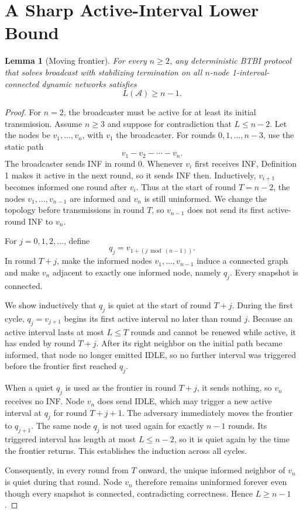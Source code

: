 \documentclass[11pt]{article}
\newtheorem{lemma}{Lemma}
\begin{document}
\section{A Sharp Active-Interval Lower Bound}
\begin{lemma}[Moving frontier]
For every $n\ge2$, any deterministic BTBI protocol that solves broadcast with stabilizing termination on all $n$-node 1-interval-connected dynamic networks satisfies
\[
L(\mathcal A)\ge n-1.
\]
\end{lemma}
\begin{proof}
For $n=2$, the broadcaster must be active for at least its initial transmission. Assume $n\ge3$ and suppose for contradiction that $L\le n-2$. Let the nodes be $v_1,\dots,v_n$, with $v_1$ the broadcaster. For rounds $0,1,\dots,n-3$, use the static path
\[
v_1-v_2-\cdots-v_n.
\]
The broadcaster sends INF in round 0. Whenever $v_i$ first receives INF, Definition 1 makes it active in the next round, so it sends INF then. Inductively, $v_{i+1}$ becomes informed one round after $v_i$. Thus at the start of round $T=n-2$, the nodes $v_1,\dots,v_{n-1}$ are informed and $v_n$ is still uninformed. We change the topology before transmissions in round $T$, so $v_{n-1}$ does not send its first active-round INF to $v_n$.

For $j=0,1,2,\dots$, define
\[
q_j=v_{1+(j\bmod(n-1))}.
\]
In round $T+j$, make the informed nodes $v_1,\dots,v_{n-1}$ induce a connected graph and make $v_n$ adjacent to exactly one informed node, namely $q_j$. Every snapshot is connected.

We show inductively that $q_j$ is quiet at the start of round $T+j$. During the first cycle, $q_j=v_{j+1}$ begins its first active interval no later than round $j$. Because an active interval lasts at most $L\le T$ rounds and cannot be renewed while active, it has ended by round $T+j$. After its right neighbor on the initial path became informed, that node no longer emitted IDLE, so no further interval was triggered before the frontier first reached $q_j$.

When a quiet $q_j$ is used as the frontier in round $T+j$, it sends nothing, so $v_n$ receives no INF. Node $v_n$ does send IDLE, which may trigger a new active interval at $q_j$ for round $T+j+1$. The adversary immediately moves the frontier to $q_{j+1}$. The same node $q_j$ is not used again for exactly $n-1$ rounds. Its triggered interval has length at most $L\le n-2$, so it is quiet again by the time the frontier returns. This establishes the induction across all cycles.

Consequently, in every round from $T$ onward, the unique informed neighbor of $v_n$ is quiet during that round. Node $v_n$ therefore remains uninformed forever even though every snapshot is connected, contradicting correctness. Hence $L\ge n-1$.
\end{proof}
\end{document}
